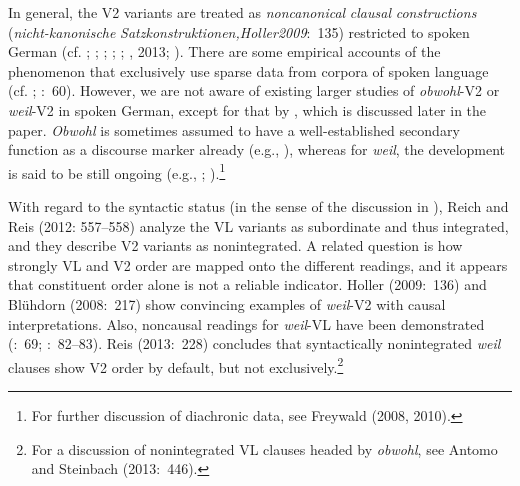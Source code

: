 \begin{styleMoutonText}
In general, the V2 variants are treated as \textit{noncanonical} \textit{clausal} \textit{constructions} (\textit{nicht-kanonische} \textit{Satzkonstruktionen,Holler2009}:~135) restricted to spoken German (cf. \citealt{Gaumann1983}; \citealt{Günthner1993}; \citealt{Wegener2000}; \citealt{Pasch1997}; \citealt{Uhmann1998}; \citealt{AntomoSteinbach2010}, 2013; \citealt{Reis2013}). There are some empirical accounts of the phenomenon that exclusively use sparse data from corpora of spoken language (cf. \citealt{GohlGünthner1999}; \citealt{Freywald2010}:~60). However, we are not aware of ex\-isting larger studies of \textit{obwohl}{}-V2 or \textit{weil}{}-V2 in spoken Ger\-man, except for that by \citet{Volodina2011}, which is discussed later in the paper. \textit{Obwohl} is sometimes assumed to have a well-established secondary function as a discourse marker already (e.g., \citealt{Günthner2000}), whereas for \textit{weil}, the development is said to be still ongoing (e.g., \citealt{GohlGünthner1999}; \citealt{Günthner2003}).\footnote{For further discussion of diachronic data, see Freywald (2008, 2010).}
\end{styleMoutonText}

\begin{styleMoutonText}
With regard to the syntactic status (in the sense of the discussion in ), Reich and Reis (2012: 557–558) analyze the VL variants as subordinate and thus integrated, and they describe V2 variants as nonintegrated. A related question is how strongly VL and V2 order are mapped onto the different readings, and it appears that constituent order alone is not a reliable indicator. Holler (2009:~136) and Blühdorn (2008:~217) show convincing examples of \textit{weil}{}-V2 with causal interpretations. Also, noncausal readings for \textit{weil}{}-VL have been demonstrated (\citealt{Wegener2000}:~69; \citealt{Volodina2011}:~82–83). Reis (2013:~228) concludes that syntactically nonintegrated \textit{weil} clauses show V2 order by default, but not exclu\-sively.\footnote{For a discussion of nonintegrated VL clauses headed by \textit{obwohl}, see Antomo and Steinbach (2013:~446).}
\end{styleMoutonText}

